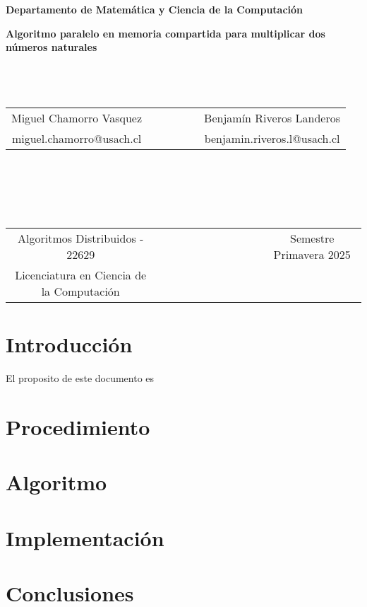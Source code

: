 \documentclass{report}
\begin{document}
	\begin{titlepage}
		\begin{center}
		\end{center}
		\begin{center}
			{\bf Departamento de Matem\'atica y Ciencia de la Computaci\'on}
		\end{center}
		\vspace{3cm}
		\begin{center}
			{\Large \bf Algoritmo paralelo en memoria compartida para multiplicar dos números naturales}
			~ \\ 
			~ \\ 
			~ \\
			~ \\
			\begin{tabular}{c c c}
				Miguel Chamorro Vasquez & ~~~~~~~ & Benjam\'in Riveros Landeros \\
				miguel.chamorro@usach.cl & & benjamin.riveros.l@usach.cl \\
			\end{tabular}
			~ \\ 
			~ \\ 
			~ \\
			~ \\
			\begin{tabular}{c c c}
				Algoritmos Distribuidos - 22629 & ~~~~~~~~~~~~~~~~~ & Semestre Primavera 2025 \\
				Licenciatura en Ciencia de la Computaci\'on & &  \\
			\end{tabular}
		\end{center}
	\end{titlepage}
	\section{Introducci\'on}
	El proposito de este documento es 
	\section{Procedimiento}

	\section{Algoritmo}
	
	\section{Implementaci\'on}
	
	\section{Conclusiones}
\end{document}
